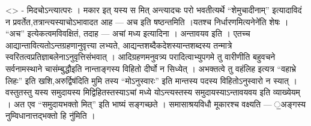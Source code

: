 \textless{}\textgreater{} - मिदचोऽन्त्यात्परः । मकार इत् यस्य स मित्
अन्त्यादचः परो भवतीत्यर्थे ``शेमुचादीनाम्'' इत्यादाविदं न
प्रवर्तेत,तत्रान्त्यस्याचोऽभावादत आह --- अच इति षष्ठन्तमिति ।यतश्च
निर्धारणमित्यनेने॑ति शेषः । ``अच'' इत्येकत्वमविवक्षितं, तदाह --- अचां
मध्य इत्यादिना । अन्तावयव इति । एतच्च
आद्यान्तावित्यतोऽन्तग्रहणानुवृत्त्या लभ्यते,
आद्यन्तशब्दैकदेशस्यान्तशब्दस्य तन्मात्रे
स्वरितत्वप्रतिज्ञाबलेनाऽनुवृत्तिसंभवात् । आदिग्रहणमनुवत्र्य
परादित्वाभ्युपगमे तु वारीणीति बहुवचने सर्वनामस्थाने चासंम्बुद्धौइति
नान्ताङ्गस्य विहितो दीर्घो न सिध्येत् । अभक्तत्वे तु वहंलिह इत्यत्र
``वहाभ्रे लिहः'' इति खशि,अरुर्द्विष॑दिति मुमि तस्य ``मोऽनुस्वारः'' इति
मान्तस्य पदस्य विहितोऽनुस्वारो न स्यात् । वस्तुतस्तु यस्य समुदायस्य
मिद्विहितस्तस्याऽचां मध्ये योऽन्त्यस्तस्य समुदायस्याऽन्तावयवय इति
व्याख्येयम् । अत एव ``समुदायभक्तो मित्'' इति भाष्यं सङ्गच्छते ।
समासाश्रयविधौ मूकारश्च वक्ष्यति --- ॒अङ्गस्य नुम्विधानात्तद्भक्तो हि
नु॑मिति ।
